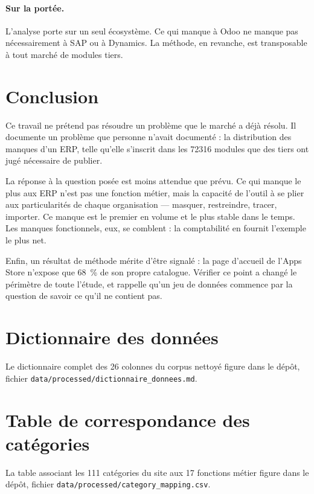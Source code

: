 \documentclass[11pt,a4paper]{article}
\begin{document}
\paragraph{Sur la portée.} L'analyse porte sur un seul écosystème. Ce qui manque
à Odoo ne manque pas nécessairement à SAP ou à Dynamics. La méthode, en
revanche, est transposable à tout marché de modules tiers.

\section{Conclusion}

Ce travail ne prétend pas résoudre un problème que le marché a déjà résolu. Il
documente un problème que personne n'avait documenté : la distribution des
manques d'un ERP, telle qu'elle s'inscrit dans les \num{72316} modules que des
tiers ont jugé nécessaire de publier.

La réponse à la question posée est moins attendue que prévu. Ce qui manque le
plus aux ERP n'est pas une fonction métier, mais la capacité de l'outil à se
plier aux particularités de chaque organisation --- masquer, restreindre, tracer,
importer. Ce manque est le premier en volume et le plus stable dans le temps.
Les manques fonctionnels, eux, se comblent : la comptabilité en fournit
l'exemple le plus net.

Enfin, un résultat de méthode mérite d'être signalé : la page d'accueil de
l'Apps Store n'expose que \SI{68}{\percent} de son propre catalogue. Vérifier ce
point a changé le périmètre de toute l'étude, et rappelle qu'un jeu de données
commence par la question de savoir ce qu'il ne contient pas.

\appendix
\section{Dictionnaire des données}

Le dictionnaire complet des \num{26} colonnes du corpus nettoyé figure dans le
dépôt, fichier \texttt{data/processed/dictionnaire\_donnees.md}.

\section{Table de correspondance des catégories}

La table associant les \num{111} catégories du site aux \num{17} fonctions
métier figure dans le dépôt, fichier
\texttt{data/processed/category\_mapping.csv}.
\end{document}
